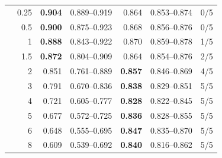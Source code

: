 \begin{table}[t]
\begin{tabular}{@{}lrrrrrc@{}}
& 0.25 & \textbf{0.904} & 0.889--0.919 & 0.864 & 0.853--0.874 & 0/5 \\
& 0.5 & \textbf{0.900} & 0.875--0.923 & 0.868 & 0.856--0.876 & 0/5 \\
& 1 & \textbf{0.888} & 0.843--0.922 & 0.870 & 0.859--0.878 & 1/5 \\
& 1.5 & \textbf{0.872} & 0.804--0.909 & 0.864 & 0.854--0.876 & 2/5 \\
& 2 & 0.851 & 0.761--0.889 & \textbf{0.857} & 0.846--0.869 & 4/5 \\
& 3 & 0.791 & 0.670--0.836 & \textbf{0.838} & 0.829--0.851 & 5/5 \\
& 4 & 0.721 & 0.605--0.777 & \textbf{0.828} & 0.822--0.845 & 5/5 \\
& 5 & 0.677 & 0.572--0.725 & \textbf{0.836} & 0.828--0.855 & 5/5 \\
& 6 & 0.648 & 0.555--0.695 & \textbf{0.847} & 0.835--0.870 & 5/5 \\
& 8 & 0.609 & 0.539--0.692 & \textbf{0.840} & 0.816--0.862 & 5/5 \\
\bottomrule
\end{tabular}
\end{table}
